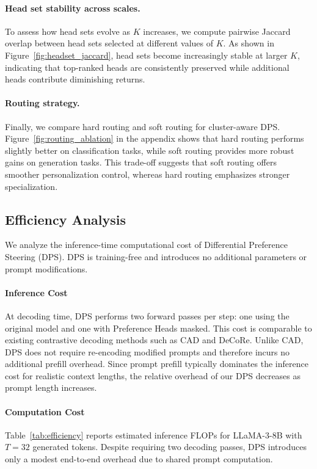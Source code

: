 \documentclass[11pt]{article}
\begin{document}
\paragraph{Head set stability across scales.}
To assess how head sets evolve as $K$ increases, we compute pairwise Jaccard overlap between head sets selected at different values of $K$.
As shown in Figure~\ref{fig:headset_jaccard}, head sets become increasingly stable at larger $K$, indicating that top-ranked heads are consistently preserved while additional heads contribute diminishing returns.

\paragraph{Routing strategy.}
Finally, we compare hard routing and soft routing for cluster-aware DPS.
Figure~\ref{fig:routing_ablation} in the appendix shows that hard routing performs slightly better on classification tasks, while soft routing provides more robust gains on generation tasks.
This trade-off suggests that soft routing offers smoother personalization control, whereas hard routing emphasizes stronger specialization.



\subsection{Efficiency Analysis}

We analyze the inference-time computational cost of Differential Preference Steering (DPS).
DPS is training-free and introduces no additional parameters or prompt modifications.

\paragraph{Inference Cost}
At decoding time, DPS performs two forward passes per step: one using the original model and one with Preference Heads masked.
This cost is comparable to existing contrastive decoding methods such as CAD and DeCoRe.
Unlike CAD, DPS does not require re-encoding modified prompts and therefore incurs no additional prefill overhead.
Since prompt prefill typically dominates the inference cost for realistic context lengths, the relative overhead of our DPS decreases as prompt length increases.

\paragraph{Computation Cost}
Table~\ref{tab:efficiency} reports estimated inference FLOPs for LLaMA-3-8B with $T=32$ generated tokens.
Despite requiring two decoding passes, DPS introduces only a modest end-to-end overhead due to shared prompt computation.
\end{document}
